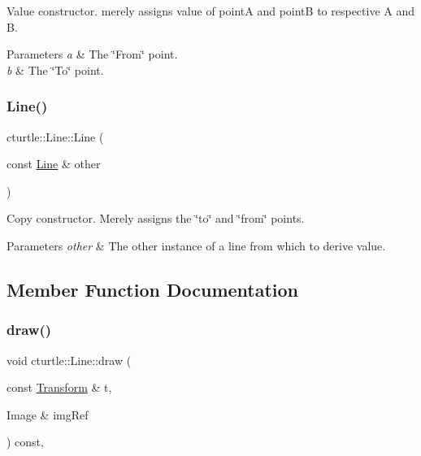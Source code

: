 Value constructor. merely assigns value of pointA and pointB to respective A and B. 


\begin{DoxyParams}{Parameters}
{\em a} & The \char`\"{}\+From\char`\"{} point. \\
\hline
{\em b} & The \char`\"{}\+To\char`\"{} point. \\
\hline
\end{DoxyParams}
\mbox{\label{classcturtle_1_1Line_ac1b144ecd3e23c5f296b4f845f332c73}} 
\subsubsection{\texorpdfstring{Line()}{Line()}\hspace{0.1cm}{\footnotesize\ttfamily [2/2]}}
{\footnotesize\ttfamily cturtle\+::\+Line\+::\+Line (\begin{DoxyParamCaption}\item[{const \hyperlink{classcturtle_1_1Line}{Line} \&}]{other }\end{DoxyParamCaption})\hspace{0.3cm}{\ttfamily [inline]}}



Copy constructor. Merely assigns the \char`\"{}to\char`\"{} and \char`\"{}from\char`\"{} points. 


\begin{DoxyParams}{Parameters}
{\em other} & The other instance of a line from which to derive value. \\
\hline
\end{DoxyParams}


\subsection{Member Function Documentation}
\mbox{\label{classcturtle_1_1Line_a25ac5b4024bf9209d324b6f8c16affaf}} 
\subsubsection{\texorpdfstring{draw()}{draw()}}
{\footnotesize\ttfamily void cturtle\+::\+Line\+::draw (\begin{DoxyParamCaption}\item[{const \hyperlink{classcturtle_1_1Transform}{Transform} \&}]{t,  }\item[{Image \&}]{img\+Ref }\end{DoxyParamCaption}) const\hspace{0.3cm}{\ttfamily [inline]}, {\ttfamily [virtual]}}



